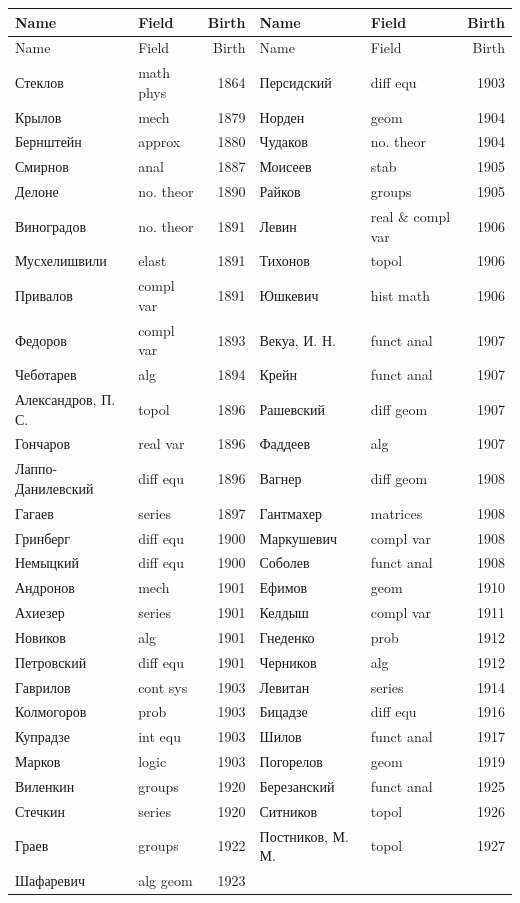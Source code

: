 \begingroup
\footnotesize
\setlength{\tabcolsep}{3.5pt}
\renewcommand{\arraystretch}{1.03}
\begin{longtable}{@{}>{\cyrillicfont}p{31mm} p{23mm} r @{\hspace{4mm}} >{\cyrillicfont}p{31mm} p{23mm} r@{}}
\toprule
\normalfont Name & Field & Birth & \normalfont Name & Field & Birth\\
\midrule
\endfirsthead
\toprule
\normalfont Name & Field & Birth & \normalfont Name & Field & Birth\\
\midrule
\endhead
Стеклов & math phys & 1864 & Персидский & diff equ & 1903\\
Крылов & mech & 1879 & Норден & geom & 1904\\
Бернштейн & approx & 1880 & Чудаков & no. theor & 1904\\
Смирнов & anal & 1887 & Моисеев & stab & 1905\\
Делоне & no. theor & 1890 & Райков & groups & 1905\\
Виноградов & no. theor & 1891 & Левин & real \& compl var & 1906\\
Мусхелишвили & elast & 1891 & Тихонов & topol & 1906\\
Привалов & compl var & 1891 & Юшкевич & hist math & 1906\\
Федоров & compl var & 1893 & Векуа, И. Н. & funct anal & 1907\\
Чеботарев & alg & 1894 & Крейн & funct anal & 1907\\
Александров, П. С. & topol & 1896 & Рашевский & diff geom & 1907\\
Гончаров & real var & 1896 & Фаддеев & alg & 1907\\
Лаппо-Данилевский & diff equ & 1896 & Вагнер & diff geom & 1908\\
Гагаев & series & 1897 & Гантмахер & matrices & 1908\\
Гринберг & diff equ & 1900 & Маркушевич & compl var & 1908\\
Немыцкий & diff equ & 1900 & Соболев & funct anal & 1908\\
Андронов & mech & 1901 & Ефимов & geom & 1910\\
Ахиезер & series & 1901 & Келдыш & compl var & 1911\\
Новиков & alg & 1901 & Гнеденко & prob & 1912\\
Петровский & diff equ & 1901 & Черников & alg & 1912\\
Гаврилов & cont sys & 1903 & Левитан & series & 1914\\
Колмогоров & prob & 1903 & Бицадзе & diff equ & 1916\\
Купрадзе & int equ & 1903 & Шилов & funct anal & 1917\\
Марков & logic & 1903 & Погорелов & geom & 1919\\
Виленкин & groups & 1920 & Березанский & funct anal & 1925\\
Стечкин & series & 1920 & Ситников & topol & 1926\\
Граев & groups & 1922 & Постников, М. М. & topol & 1927\\
Шафаревич & alg geom & 1923 & & &\\
\bottomrule
\end{longtable}
\endgroup
